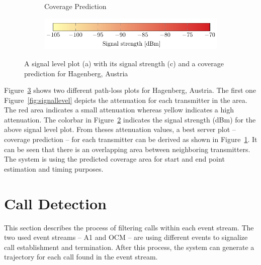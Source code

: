 \documentclass[master,english]{hgbthesis}
\begin{document}
\begin{figure}
\begin{subfigure}[b]{0.45\textwidth}
		\caption{Coverage Prediction}
		\label{fig:coveragepred}
	\end{subfigure}
\begin{subfigure}[b]{\textwidth}
		\includegraphics[width=\textwidth]{./images/signallevelbar}
		\caption{}
		\label{fig:signallevelbar}
	\end{subfigure}
	\caption{A signal level plot (a) with its signal strength (c) and a coverage prediction for Hagenberg, Austria }
	\label{fig:cellarea}
\end{figure}
Figure~\ref{fig:cellarea} shows two different path-loss plots for Hagenberg, Austria. The first one Figure~\ref{fig:signallevel} depicts the attenuation for each transmitter in the area. The red area indicates a small attenuation whereas yellow indicates a high attenuation. The colorbar in Figure~\ref{fig:signallevelbar} indicates the signal strength (dBm) for the above signal level plot.
%
From theses attenuation values, a best server plot -- coverage prediction -- for each transmitter can be derived as shown in Figure~\ref{fig:coveragepred}. It can be seen that there is an overlapping area between neighboring transmitters. The system is using the predicted coverage area for start and end point estimation and timing purposes.
\section{Call Detection}
This section describes the process of filtering calls within each event stream. The two used event streams -- A1 and OCM -- are using different events to signalize call establishment and termination. After this process, the system can generate a trajectory for each call found in the event stream.
\end{document}
